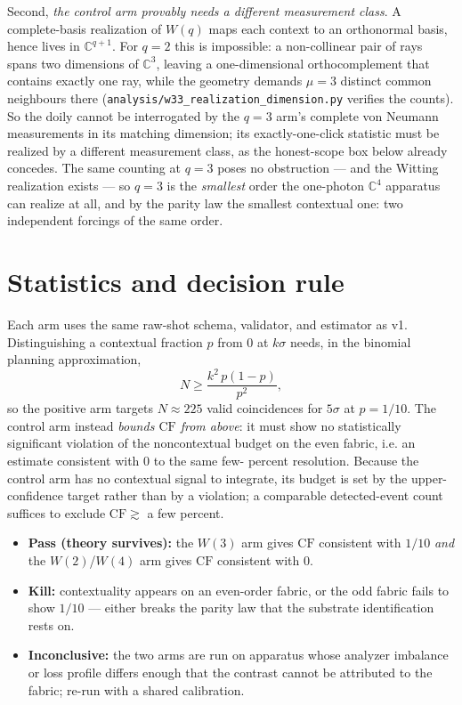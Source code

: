\documentclass[11pt]{article}
\begin{document}
Second, \emph{the control arm provably needs a different measurement class}.  A complete-basis
realization of $W(q)$ maps each context to an orthonormal basis, hence lives in $\mathbb C^{q+1}$.  For
$q=2$ this is impossible: a non-collinear pair of rays spans two dimensions of $\mathbb C^3$, leaving a
one-dimensional orthocomplement that contains exactly one ray, while the geometry demands $\mu=3$
distinct common neighbours there (\texttt{analysis/w33\_realization\_dimension.py} verifies the counts).
So the doily cannot be interrogated by the $q=3$ arm's complete von Neumann measurements in its matching
dimension; its exactly-one-click statistic must be realized by a different measurement class, as the
honest-scope box below already concedes.  The same counting at $q=3$ poses no obstruction --- and the
Witting realization exists --- so $q=3$ is the \emph{smallest} order the one-photon $\mathbb C^4$
apparatus can realize at all, and by the parity law the smallest contextual one: two independent
forcings of the same order.

\section{Statistics and decision rule}
Each arm uses the same raw-shot schema, validator, and estimator as v1.  Distinguishing a contextual
fraction $p$ from $0$ at $k\sigma$ needs, in the binomial planning approximation,
\[
  N \ge \frac{k^2\,p(1-p)}{p^2},
\]
so the positive arm targets $N\approx 225$ valid coincidences for $5\sigma$ at $p=1/10$.  The control
arm instead \emph{bounds $\mathrm{CF}$ from above}: it must show no statistically significant violation
of the noncontextual budget on the even fabric, i.e. an estimate consistent with $0$ to the same few-
percent resolution.  Because the control arm has no contextual signal to integrate, its budget is set by
the upper-confidence target rather than by a violation; a comparable detected-event count suffices to
exclude $\mathrm{CF}\gtrsim$ a few percent.

\begin{decisionbox}
\begin{itemize}[leftmargin=1.4em]
\item \textbf{Pass (theory survives):} the $W(3)$ arm gives $\mathrm{CF}$ consistent with $1/10$ \emph{and}
the $W(2)$/$W(4)$ arm gives $\mathrm{CF}$ consistent with $0$.
\item \textbf{Kill:} contextuality appears on an even-order fabric, or the odd fabric fails to show
$1/10$ --- either breaks the parity law that the substrate identification rests on.
\item \textbf{Inconclusive:} the two arms are run on apparatus whose analyzer imbalance or loss profile
differs enough that the contrast cannot be attributed to the fabric; re-run with a shared calibration.
\end{itemize}
\end{decisionbox}
\end{document}
